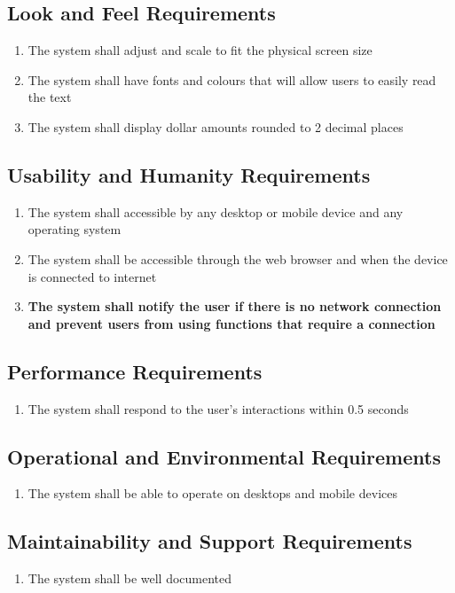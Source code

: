 \documentclass[12pt]{article}
\begin{document}
\subsection{Look and Feel Requirements}
\begin{enumerate}[LF\arabic*.]
	\item The system shall adjust and scale to fit the physical screen size
	\item The system shall have fonts and colours that will allow users to easily read the text
	\item The system shall display dollar amounts rounded to 2 decimal places
\end{enumerate}

\subsection{Usability and Humanity Requirements}
\begin{enumerate}[UH\arabic*.]
	\item The system shall accessible by any desktop or mobile device and any operating system
	\item The system shall be accessible through the web browser and when the device is connected to internet
	\item \textbf{The system shall notify the user if there is no network connection and prevent users from using functions that require a connection}
\end{enumerate}

\subsection{Performance Requirements}
\begin{enumerate}[PR\arabic*.]
	\item The system shall respond to the user's interactions within 0.5 seconds
\end{enumerate}

\subsection{Operational and Environmental Requirements}
\begin{enumerate}[OE\arabic*.]
	\item The system shall be able to operate on desktops and mobile devices
\end{enumerate}

\subsection{Maintainability and Support Requirements}
\begin{enumerate}[MS\arabic*.]
	\item The system shall be well documented
\end{enumerate}
\end{document}
